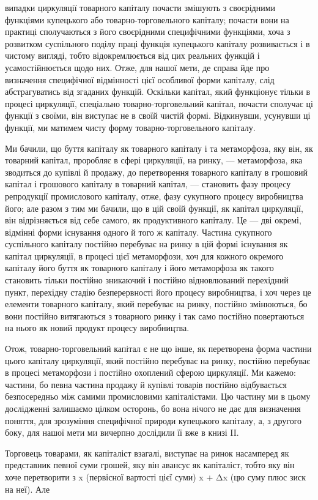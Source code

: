 випадки циркуляції товарного капіталу почасти змішують з своєрідними
функціями купецького або товарно-торговельного капіталу;
почасти вони на практиці сполучаються з його своєрідними
специфічними функціями, хоча з розвитком суспільного
поділу праці функція купецького капіталу розвивається і в чистому
вигляді, тобто відокремлюється від цих реальних функцій
і усамостійнюється щодо них. Отже, для нашої мети, де справа
йде про визначення специфічної відмінності цієї особливої форми
капіталу, слід абстрагуватись від згаданих функцій. Оскільки
капітал, який функціонує тільки в процесі циркуляції, спеціально
товарно-торговельний капітал, почасти сполучає ці функції з своїми,
він виступає не в своїй чистій формі. Відкинувши, усунувши
ці функції, ми матимем чисту форму товарно-торговельного капіталу.

Ми бачили, що буття капіталу як товарного капіталу і та
метаморфоза, яку він, як товарний капітал, проробляє в сфері
циркуляції, на ринку, — метаморфоза, яка зводиться до купівлі
й продажу, до перетворення товарного капіталу в грошовий капітал
і грошового капіталу в товарний капітал, — становить фазу
процесу репродукції промислового капіталу, отже, фазу сукупного
процесу виробництва його; але разом з тим ми бачили, що
в цій своїй функції, як капітал циркуляції, він відрізняється
від себе самого, як продуктивного капіталу. Це — дві окремі,
відмінні форми існування одного й того ж капіталу. Частина
сукупного суспільного капіталу постійно перебуває на ринку
в цій формі існування як капітал циркуляції, в процесі цієї метаморфози,
хоч для кожного окремого капіталу його буття як
товарного капіталу і його метаморфоза як такого становить
тільки постійно зникаючий і постійно відновлюваний перехідний
пункт, перехідну стадію безперервності його процесу виробництва,
і хоч через це елементи товарного капіталу, який перебуває
на ринку, постійно змінюються, бо вони постійно витягаються
з товарного ринку і так само постійно повертаються на нього
як новий продукт процесу виробництва.

Отож, товарно-торговельний капітал є не що інше, як перетворена
форма частини цього капіталу циркуляції, який постійно
перебуває на ринку, постійно перебуває в процесі метаморфози
і постійно охоплений сферою циркуляції. Ми кажемо: частини,
бо певна частина продажу й купівлі товарів постійно відбувається
безпосередньо між самими промисловими капіталістами.
Цю частину ми в цьому дослідженні залишаємо цілком осторонь,
бо вона нічого не дає для визначення поняття, для зрозуміння
специфічної природи купецького капіталу, а, з другого
боку, для нашої мети ми вичерпно дослідили її вже в книзі II.

Торговець товарами, як капіталіст взагалі, виступає на ринок
насамперед як представник певної суми грошей, яку він авансує
як капіталіст, тобто яку він хоче перетворити з x (первісної
вартості цієї суми) x + Δx (цю суму плюс зиск на неї). Але
